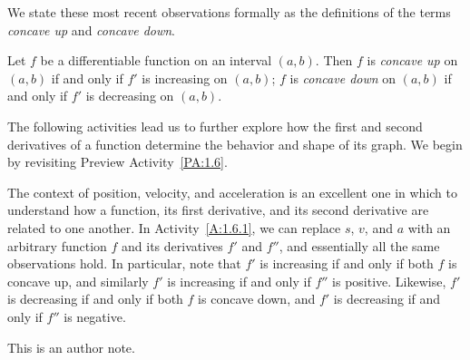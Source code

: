 We state these most recent observations formally as the definitions of the terms \emph{concave up} and \emph{concave down}.

\begin{definition}
Let $f$ be a differentiable function on an interval $(a,b)$.  Then $f$ is \emph{concave up}  on $(a,b)$ if and only if $f'$ is increasing on $(a,b)$;  $f$ is \emph{concave down}  on $(a,b)$ if and only if $f'$ is decreasing on $(a,b)$.
\end{definition}

The following activities lead us to further explore how the first and second derivatives of a function determine the behavior and shape of its graph.  We begin by revisiting Preview Activity~\ref{PA:1.6}.



The context of position, velocity, and acceleration is an excellent one in which to understand how a function, its first derivative, and its second derivative are related to one another.  In Activity~\ref{A:1.6.1}, we can replace $s$, $v$, and $a$ with an arbitrary function $f$ and its derivatives $f'$ and $f''$, and essentially all the same observations hold.  In particular, note that $f'$ is increasing if and only if both $f$ is concave up, and similarly $f'$ is increasing if and only if $f''$ is positive.  Likewise, $f'$ is decreasing if and only if both $f$ is concave down, and $f'$ is decreasing if and only if $f''$ is negative.






\begin{authornote}
This is an author note.
\end{authornote}

